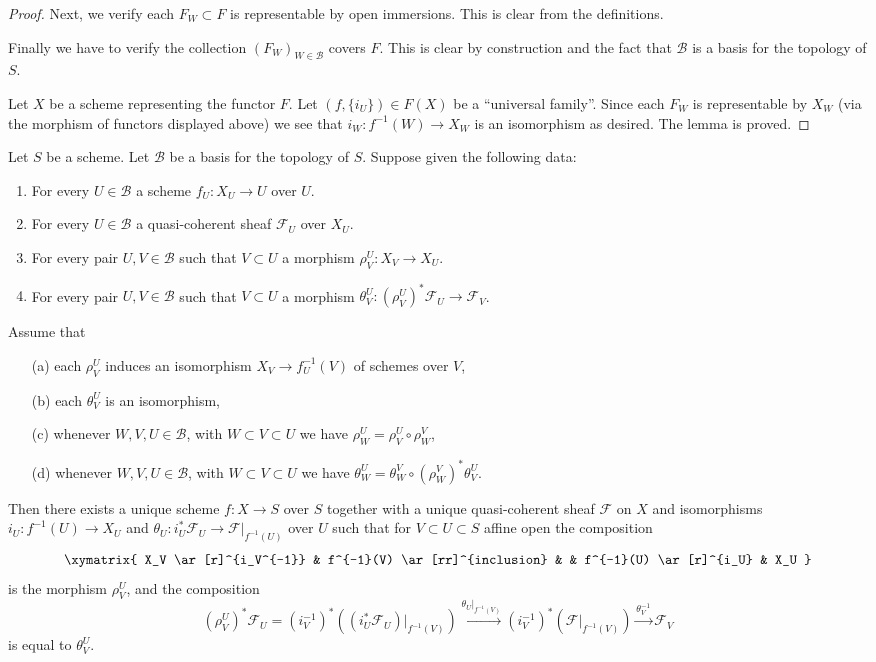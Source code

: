 \begin{proof}
\medskip\noindent
Next, we verify each $F_W \subset F$ is representable by open immersions.
This is clear from the definitions.

\medskip\noindent
Finally we have to verify
the collection $(F_W)_{W \in \mathcal{B}}$ covers $F$.
This is clear by construction and the fact that $\mathcal{B}$ is
a basis for the topology of $S$.

\medskip\noindent
Let $X$ be a scheme representing the functor $F$.
Let $(f, \{i_U\}) \in F(X)$ be a ``universal family''.
Since each $F_W$ is representable by $X_W$ (via the morphism of functors
displayed above) we see that $i_W : f^{-1}(W) \to X_W$
is an isomorphism as desired. The lemma is proved.
\end{proof}

\begin{lemma}
\label{lemma-relative-glueing-sheaves}
Let $S$ be a scheme.
Let $\mathcal{B}$ be a basis for the topology of $S$.
Suppose given the following data:
\begin{enumerate}
\item For every $U \in \mathcal{B}$ a scheme $f_U : X_U \to U$ over $U$.
\item For every $U \in \mathcal{B}$ a quasi-coherent sheaf $\mathcal{F}_U$
over $X_U$.
\item For every pair $U, V \in \mathcal{B}$ such that
$V \subset U$ a morphism $\rho^U_V : X_V \to X_U$.
\item  For every pair $U, V \in \mathcal{B}$ such that
$V \subset U$ a morphism
$\theta^U_V : (\rho^U_V)^*\mathcal{F}_U \to \mathcal{F}_V$.
\end{enumerate}
Assume that
\begin{enumerate}
\item[(a)] each $\rho^U_V$ induces an isomorphism
$X_V \to f_U^{-1}(V)$ of schemes over $V$,
\item[(b)] each $\theta^U_V$ is an isomorphism,
\item[(c)] whenever $W, V, U \in \mathcal{B}$, with
$W \subset V \subset U$ we have $\rho^U_W = \rho^U_V \circ \rho ^V_W$,
\item[(d)] whenever $W, V, U \in \mathcal{B}$, with
$W \subset V \subset U$ we have
$\theta^U_W = \theta^V_W \circ (\rho^V_W)^*\theta^U_V$.
\end{enumerate}
Then there exists a unique scheme $f : X \to S$ over $S$
together with a unique quasi-coherent sheaf $\mathcal{F}$ on $X$
and isomorphisms $i_U : f^{-1}(U) \to X_U$ and
$\theta_U : i_U^*\mathcal{F}_U \to \mathcal{F}|_{f^{-1}(U)}$
over $U$ such that
for $V \subset U \subset S$ affine open the composition
$$
\xymatrix{
X_V \ar[r]^{i_V^{-1}} &
f^{-1}(V) \ar[rr]^{inclusion} & &
f^{-1}(U) \ar[r]^{i_U} &
X_U
}
$$
is the morphism $\rho^U_V$, and the composition
\begin{equation}
\label{equation-glue}
(\rho^U_V)^*\mathcal{F}_U
=
(i_V^{-1})^*((i_U^*\mathcal{F}_U)|_{f^{-1}(V)})
\xrightarrow{\theta_U|_{f^{-1}(V)}}
(i_V^{-1})^*(\mathcal{F}|_{f^{-1}(V)})
\xrightarrow{\theta_V^{-1}}
\mathcal{F}_V
\end{equation}
is equal to $\theta^U_V$.
\end{lemma}

